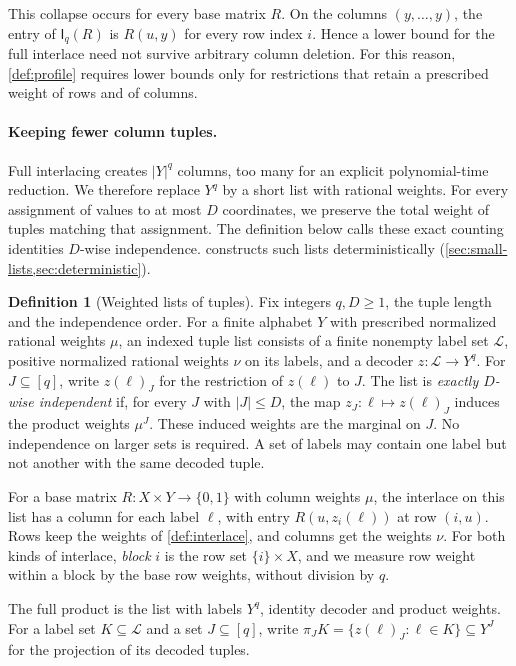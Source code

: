 \documentclass[11pt,letterpaper]{article} \usepackage[utf8]{inputenc}
\theoremstyle{plain} \newtheorem{theorem}{Theorem}[section]
\theoremstyle{definition} \newaliascnt{definition}{theorem}
\newtheorem{definition}[definition]{Definition} \aliascntresetthe{definition}
\newcommand{\Int}[2]{\mathsf{I}_{#1}(#2)}
\begin{document}
This collapse occurs for every base matrix $R$. On the columns
$(y,\ldots,y)$, the entry of $\Int{q}{R}$ is $R(u,y)$ for every row index
$i$. Hence a lower bound for the full interlace need not survive arbitrary
column deletion. For this reason, \cref{def:profile} requires lower bounds only for
restrictions that retain a prescribed weight of rows and of columns.

\paragraph{Keeping fewer column tuples.}
Full interlacing creates $|Y|^q$ columns, too many for an explicit
polynomial-time reduction. We therefore
replace $Y^q$ by a short list with rational weights. For every assignment of
values to at most $D$ coordinates, we preserve the total weight of tuples
matching that assignment. The definition below calls these exact counting
identities $D$-wise independence.  constructs such lists
deterministically (\cref{sec:small-lists,sec:deterministic}).

\begin{definition}[Weighted lists of tuples]\label{def:exact-tuples}
Fix integers $q,D\ge1$, the tuple length and the independence order. For a finite alphabet $Y$ with prescribed
normalized rational weights $\mu$, an indexed tuple list consists of a
finite nonempty label set $\mathcal L$, positive normalized rational
weights $\nu$ on its labels, and a decoder $z:\mathcal L\to Y^q$.
For $J\subseteq[q]$, write $z(\ell)_J$ for the restriction of $z(\ell)$ to $J$.
The list is \emph{exactly $D$-wise independent} if, for every $J$ with $|J|\le D$,
the map $z_J:\ell\mapsto z(\ell)_J$ induces the product weights $\mu^J$. These induced
weights are the marginal on $J$.
No independence on larger sets is required. A set of labels may contain one label
but not another with the same decoded tuple.

For a base matrix $R:X\times Y\to\{0,1\}$ with column weights $\mu$,
the interlace on this list has a column for each label $\ell$, with entry
$R(u,z_i(\ell))$ at row $(i,u)$. Rows keep the weights of \cref{def:interlace}, and columns
get the weights $\nu$. For both kinds of interlace, \emph{block} $i$ is the row set
$\{i\}\times X$, and we measure row weight within a block by the base row
weights, without division by $q$.
\end{definition}

The full product is the list with labels $Y^q$, identity decoder and
product weights. For a label set $K\subseteq\mathcal L$ and a set $J\subseteq[q]$, write
$\pi_JK=\{z(\ell)_J:\ell\in K\}\subseteq Y^J$ for the projection of its decoded tuples.
\end{document}
